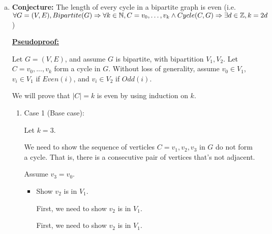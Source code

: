 \documentclass[12pt]{article}
\begin{document}
\begin{enumerate}[a.]
    \item

    \textbf{Conjecture:} The length of every cycle in a bipartite graph is even
    (i.e. $\forall G = (V,E),\\ Bipartite(G) \Rightarrow \forall k \in \mathbb{N}, C = v_0,\dots,v_k \land Cycle(C,G) \Rightarrow \exists d \in \mathbb{Z}, k = 2d$)

    \bigskip

    \begin{mdframed}
        \underline{\textbf{Pseudoproof:}}

        \bigskip

        Let $G = (V,E)$, and assume $G$ is bipartite, with bipartition $V_1,V_2$.
        Let $C = v_0,...,v_k$ form a cycle in $G$. Without loss of generality,
        assume $v_0 \in V_1$, $v_i \in V_1$ if $Even(i)$, and $v_i \in V_2$ if $Odd(i)$.

        \bigskip

        We will prove that $|C| = k$ is even by using induction on $k$.

        \bigskip

        \begin{enumerate}[1.]
            \item Case 1 (Base case):

            \bigskip

            Let $k = 3$.

            \bigskip

            We need to show the sequence of verticles $C=v_1,v_2,v_3$ in $G$ do not
            form a cycle. That is, there is a consecutive pair of vertices that's not
            adjacent.

            \bigskip

            Assume $v_3 = v_0$.

            \bigskip

            \begin{itemize}
                \item Show $v_2$ is in $V_1$.

                \bigskip

                First, we need to show $v_2$ is in $V_1$.

                \begin{mdframed}
                First, we need to show $v_2$ is in $V_1$.

                \bigskip


\end{mdframed}
\end{itemize}
\end{enumerate}
\end{mdframed}
\end{enumerate}
\end{document}
